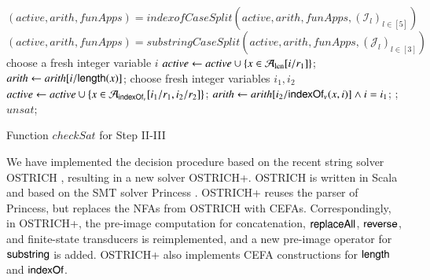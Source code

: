 
\begin{algorithm}[tbp]
	\small
	{
		$(\mathit{active}, \mathit{arith}, \mathit{funApps}) = \mathit{indexofCaseSplit}(\mathit{active}, \mathit{arith}, \mathit{funApps}, (\mathcal{I}_l)_{l \in [5]})$\; 
		$(\mathit{active}, \mathit{arith}, \mathit{funApps})= \mathit{substringCaseSplit}(\mathit{active}, \mathit{arith}, \mathit{funApps}, (\mathcal{J}_l)_{l \in [3]})$\; 
		{
			choose a fresh integer variable $i$\;
			$\mathit{active} \leftarrow \mathit{active} \cup \{x \in \mathcal{A}_{\rm len}[i/r_1]\}$; $\mathit{arith}\leftarrow \mathit{arith}[i/\mathsf{length}(x)]$;
		}
		{
			choose fresh integer variables $i_1,i_2$\;
			$\mathit{active} \leftarrow \mathit{active} \cup \{x \in \mathcal{A}_{\mathsf{indexOf}_v}[i_1/r_1,i_2/r_2]\}$; $\mathit{arith}\leftarrow \mathit{arith}[i_2/\mathsf{indexOf}_v(x,i)] \wedge i=i_1$;
		}
		{
			;}
	}
	\Return $\mathit{unsat}$; 		
	\caption{Function $\mathit{checkSat}$
		for Step II-III} \label{alg:checksat} 
\end{algorithm}

We have implemented the decision procedure based on the recent string solver OSTRICH \cite{CHL+19}, resulting in a new solver OSTRICH+. OSTRICH is  written in Scala and based on the SMT solver Princess \cite{princess08}. OSTRICH+ reuses the parser of Princess, but replaces the NFAs from OSTRICH with CEFAs. Correspondingly, in OSTRICH+, the pre-image  computation for concatenation, $\mathsf{replaceAll}$, $\mathsf{reverse}$, and finite-state transducers is reimplemented, and a new pre-image operator for $\mathsf{substring}$ is added. OSTRICH+ also implements CEFA constructions for $\mathsf{length}$ and $\mathsf{indexOf}$.  

